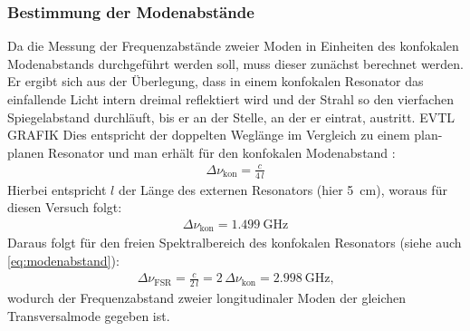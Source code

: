 \documentclass[11pt, a4paper]{article}
\numberwithin{equation}{section}
\begin{document}
\subsubsection{Bestimmung der Modenabstände}
Da die Messung der Frequenzabstände zweier Moden in Einheiten des konfokalen Modenabstands durchgeführt werden soll, muss dieser zunächst berechnet werden. 
Er ergibt sich aus der Überlegung, dass in einem konfokalen Resonator das einfallende Licht intern dreimal reflektiert wird und der Strahl so den vierfachen Spiegelabstand durchläuft, bis er an der Stelle, an der er eintrat, austritt.
EVTL GRAFIK
Dies entspricht der doppelten Weglänge im Vergleich zu einem plan-planen Resonator und man erhält für den konfokalen Modenabstand \cite{anleitung}:
\begin{align}
\Delta\nu_\text{kon}=\frac{c}{4\,l}
\end{align}
Hierbei entspricht $l$ der Länge des externen Resonators (hier \SI{5}{\centi\metre}), woraus für diesen Versuch folgt:
\begin{align}
\Delta\nu_\text{kon}=\SI{1.499}{\giga\hertz}
\end{align}
Daraus folgt für den freien Spektralbereich des konfokalen Resonators (siehe auch \eqref{eq:modenabstand}):
\begin{align}
\Delta\nu_\text{FSR}=\frac{c}{2\,l}=2\,\Delta\nu_\text{kon}=\SI{2.998}{\giga\hertz} \text{,}
\end{align}
wodurch der Frequenzabstand zweier longitudinaler Moden der gleichen Transversalmode gegeben ist.
\end{document}
